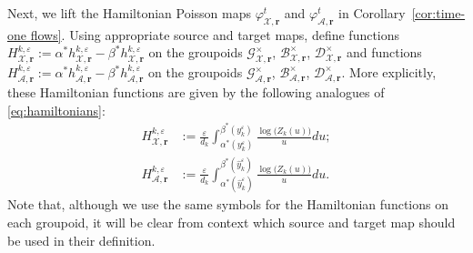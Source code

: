 \documentclass{amsart}
\numberwithin{equation}{section}
\newcommand{\bfr}{{\boldsymbol{r}}}
\newcommand{\cA}{\mathcal{A}}
\newcommand{\cB}{\mathcal{B}}
\newcommand{\cD}{\mathcal{D}}
\newcommand{\cG}{\mathcal{G}}
\newcommand{\cX}{\mathcal{X}}
\begin{document}
Next, we lift the Hamiltonian Poisson maps $\varphi_{\cX,\bfr}^t$ and $\varphi_{\cA,\bfr}^t$ in Corollary~\ref{cor:time-one flows}. Using appropriate source and target maps, define functions $H_{\cX,\bfr}^{k,\varepsilon}:=\alpha^* h_{\cX,\bfr}^{k,\varepsilon}-\beta^* h_{\cX,\bfr}^{k,\varepsilon}$ on the groupoids $\cG^\times_{\cX,\bfr}$, $\cB^\times_{\cX,\bfr}$, $\cD^\times_{\cX,\bfr}$ and functions $H_{\cA,\bfr}^{k,\varepsilon}:=\alpha^* h_{\cA,\bfr}^{k,\varepsilon}-\beta^* h_{\cA,\bfr}^{k,\varepsilon}$ on the groupoids $\cG^\times_{\cA,\bfr}$, $\cB^\times_{\cA,\bfr}$, $\cD^\times_{\cA,\bfr}$.
More explicitly, these Hamiltonian functions are given by the following analogues of \eqref{eq:hamiltonians}:
\begin{align}
  \label{eq:X hamiltonian}
  H_{\cX,\bfr}^{k,\varepsilon}&:=\frac{\varepsilon}{d_k}\int_{\alpha^*(y_k^\varepsilon)}^{\beta^*(y_k^\varepsilon)} \frac{\log\big(Z_k(u)\big)}{u}du;\\
  \label{eq:A hamiltonian}
  H_{\cA,\bfr}^{k,\varepsilon}&:=\frac{\varepsilon}{d_k}\int_{\alpha^*(\hat y_k^\varepsilon)}^{\beta^*(\hat y_k^\varepsilon)} \frac{\log\big(Z_k(u)\big)}{u}du.
\end{align}
Note that, although we use the same symbols for the Hamiltonian functions on each groupoid, it will be clear from context which source and target map should be used in their definition.
\end{document}
